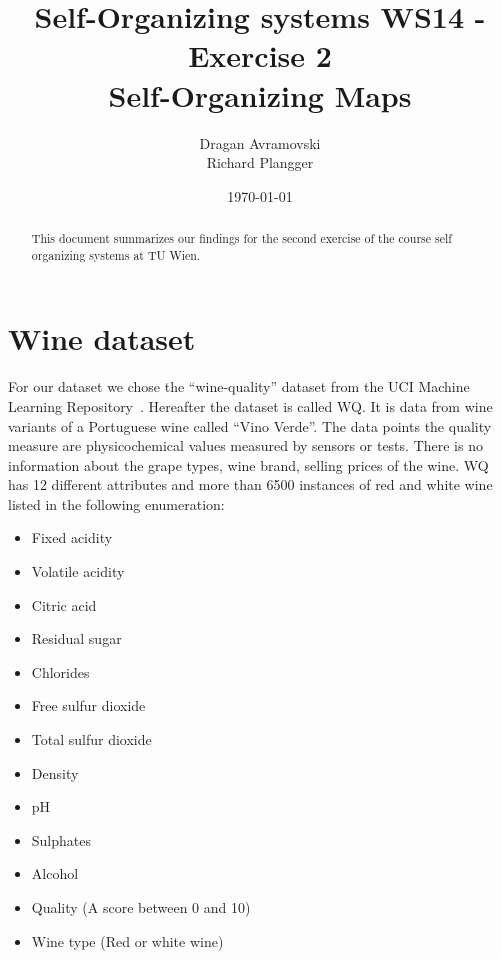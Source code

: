 \documentclass{acm_proc_article-sp}
\begin{document}
\title{Self-Organizing systems WS14 - Exercise 2\\
       Self-Organizing Maps}%

\author{
\alignauthor
Dragan Avramovski\\
\alignauthor
Richard Plangger\\
}

\date{\today}

\maketitle

\begin{abstract}
    This document summarizes our findings for the second exercise
    of the course self organizing systems at TU Wien.
\end{abstract}


\section{Wine dataset}

For our dataset we chose the ``wine-quality'' dataset from the UCI Machine Learning Repository~\cite{ucirepo}. 
Hereafter the dataset is called WQ.
It is data from wine variants of a Portuguese wine called ``Vino Verde''.
The data points the quality measure are physicochemical values measured
by sensors or tests. There is no information about the grape types,
wine brand, selling prices of the wine.
WQ has 12 different attributes and more than 6500 instances of red and white wine listed in the following enumeration:

\begin{itemize}
    \item Fixed acidity
    \item Volatile acidity
    \item Citric acid
    \item Residual sugar
    \item Chlorides
    \item Free sulfur dioxide
    \item Total sulfur dioxide
    \item Density
    \item pH
    \item Sulphates
    \item Alcohol
    \item Quality (A score between 0 and 10)
    \item Wine type (Red or white wine)
\end{itemize}
\end{document}
